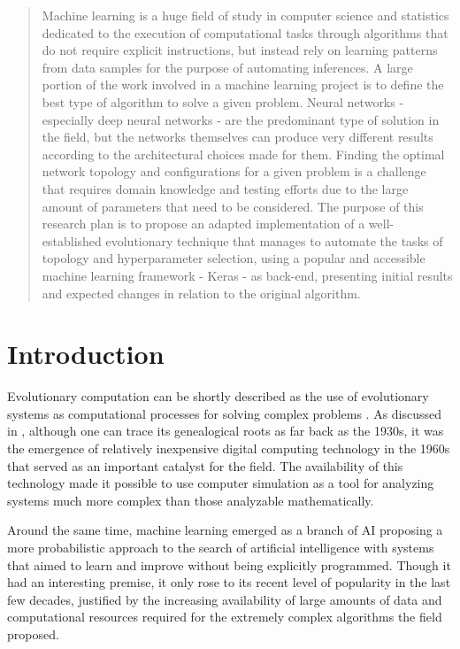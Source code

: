 \documentclass[12pt]{article}
\begin{document}
\begin{abstract}

Machine learning is a huge field of study in computer science and statistics dedicated to the execution of computational tasks through algorithms that do not require explicit instructions, but instead rely on learning patterns from data samples for the purpose of automating inferences. A large portion of the work involved in a machine learning project is to define the best type of algorithm to solve a given problem. Neural networks - especially deep neural networks - are the predominant type of solution in the field, but the networks themselves can produce very different results according to the architectural choices made for them. Finding the optimal network topology and configurations for a given problem is a challenge that requires domain knowledge and testing efforts due to the large amount of parameters that need to be considered. The purpose of this research plan is to propose an adapted implementation of a well-established evolutionary technique that manages to automate the tasks of topology and hyperparameter selection, using a popular and accessible machine learning framework - Keras - as back-end, presenting initial results and expected changes in relation to the original algorithm.
\end{abstract}

\section{Introduction}

Evolutionary computation can be shortly described as the use of evolutionary systems as computational processes for solving complex problems \cite{DeJong:2016:ECU:3027779}. As discussed in \cite{DeJong:2016:ECU:3027779}, although one can trace its genealogical roots as far back as the 1930s, it was the emergence of relatively inexpensive digital computing technology in the 1960s that served as an important catalyst for the field. The availability of this technology made it possible to use computer simulation as a tool for analyzing systems much more complex than those analyzable mathematically.

Around the same time, machine learning emerged as a branch of AI proposing a more probabilistic approach to the search of artificial intelligence with systems that aimed to learn and improve without being explicitly programmed. Though it had an interesting premise, it only rose to its recent level of popularity in the last few decades, justified by the increasing availability of large amounts of data and computational resources required for the extremely complex algorithms the field proposed.
\end{document}
